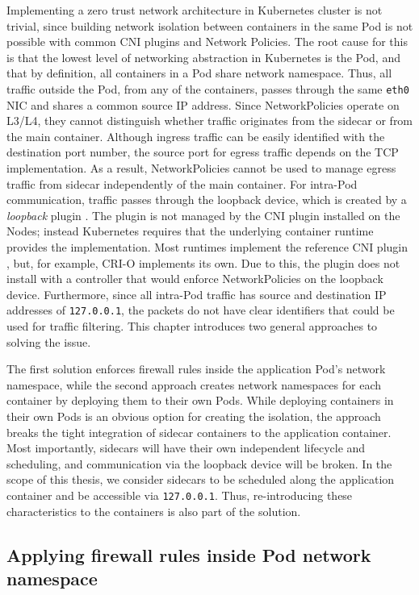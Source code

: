 \documentclass[english, 12pt, a4paper, sci, utf8, a-2b, online]{aaltothesis}
\begin{document}
Implementing a zero trust network architecture in Kubernetes cluster is not trivial, since building network isolation between containers in the same Pod is not possible with common CNI plugins and Network Policies.
The root cause for this is that the lowest level of networking abstraction in Kubernetes is the Pod, and that by definition, all containers in a Pod share network namespace.
Thus, all traffic outside the Pod, from any of the containers, passes through the same \texttt{eth0} NIC and shares a common source IP address.
Since NetworkPolicies operate on L3/L4, they cannot distinguish whether traffic originates from the sidecar or from the main container.
Although ingress traffic can be easily identified with the destination port number, the source port for egress traffic depends on the TCP implementation.
As a result, NetworkPolicies cannot be used to manage egress traffic from sidecar independently of the main container.
For intra-Pod communication, traffic passes through the loopback device, which is created by a \emph{loopback} plugin \cite{k8s-docs-cni}.
The plugin is not managed by the CNI plugin installed on the Nodes; instead Kubernetes requires that the underlying container runtime provides the implementation.
Most runtimes implement the reference CNI plugin \cite{cni-loopback}, but, for example, CRI-O implements its own.
Due to this, the plugin does not install with a controller that would enforce NetworkPolicies on the loopback device.
Furthermore, since all intra-Pod traffic has source and destination IP addresses of \texttt{127.0.0.1}, the packets do not have clear identifiers that could be used for traffic filtering.
This chapter introduces two general approaches to solving the issue.

The first solution enforces firewall rules inside the application Pod's network namespace, while the second approach creates network namespaces for each container by deploying them to their own Pods.
While deploying containers in their own Pods is an obvious option for creating the isolation, the approach breaks the tight integration of sidecar containers to the application container.
Most importantly, sidecars will have their own independent lifecycle and scheduling, and communication via the loopback device will be broken.
In the scope of this thesis, we consider sidecars to be scheduled along the application container and be accessible via \texttt{127.0.0.1}.
Thus, re-introducing these characteristics to the containers is also part of the solution.

\subsection{Applying firewall rules inside Pod network namespace}
\end{document}
